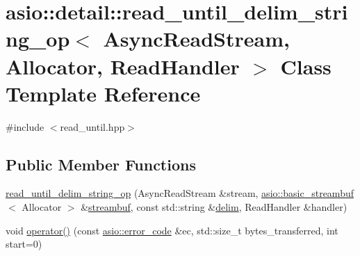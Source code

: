 \hypertarget{classasio_1_1detail_1_1read__until__delim__string__op}{}\section{asio\+:\+:detail\+:\+:read\+\_\+until\+\_\+delim\+\_\+string\+\_\+op$<$ Async\+Read\+Stream, Allocator, Read\+Handler $>$ Class Template Reference}
\label{classasio_1_1detail_1_1read__until__delim__string__op}


{\ttfamily \#include $<$read\+\_\+until.\+hpp$>$}

\subsection*{Public Member Functions}
\begin{DoxyCompactItemize}
\item 
\hyperlink{classasio_1_1detail_1_1read__until__delim__string__op_aa2df29e1d309ef89d7df5d1f2558eb71}{read\+\_\+until\+\_\+delim\+\_\+string\+\_\+op} (Async\+Read\+Stream \&stream, \hyperlink{classasio_1_1basic__streambuf}{asio\+::basic\+\_\+streambuf}$<$ Allocator $>$ \&\hyperlink{namespaceasio_a6a7ba348943527312eeace3492bf32ee}{streambuf}, const std\+::string \&\hyperlink{group__async__read__until_gafbf62a75ad736aff941c1f70d4b3c223}{delim}, Read\+Handler \&handler)
\item 
void \hyperlink{classasio_1_1detail_1_1read__until__delim__string__op_aa8a7c10f635f8b200326724cff9cc230}{operator()} (const \hyperlink{classasio_1_1error__code}{asio\+::error\+\_\+code} \&ec, std\+::size\+\_\+t bytes\+\_\+transferred, int start=0)
\end{DoxyCompactItemize}
